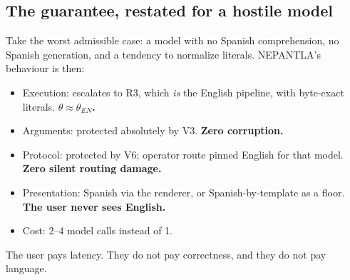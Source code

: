 \subsection{The guarantee, restated for a hostile model}
\label{sec:guarantee-restated-hostile-model}

Take the worst admissible case: a model with no Spanish comprehension, no Spanish
generation, and a tendency to normalize literals. NEPANTLA's behaviour is then:

\begin{itemize}
  \item Execution: escalates to R3, which \emph{is} the English pipeline, with
        byte-exact literals. \textbf{$\theta \approx \theta_{EN}$.}
  \item Arguments: protected absolutely by V3. \textbf{Zero corruption.}
  \item Protocol: protected by V6; operator route pinned English for that model.
        \textbf{Zero silent routing damage.}
  \item Presentation: Spanish via the renderer, or Spanish-by-template as a floor.
        \textbf{The user never sees English.}
  \item Cost: 2--4 model calls instead of 1.
\end{itemize}

The user pays latency. They do not pay correctness, and they do not pay language.

